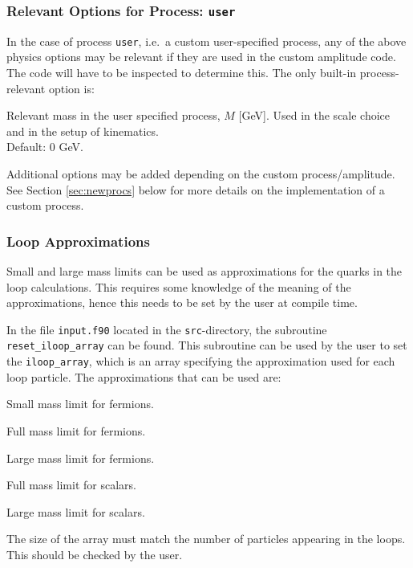 \documentclass[12pt,a4wide]{article}
\begin{document}
\subsubsection{Relevant Options for Process: \texttt{user}}
In the case of process \texttt{user}, i.e.\ a custom user-specified process, any of the above physics options may be relevant if they are used in the custom amplitude code. The code will have to be inspected to determine this. The only built-in process-relevant option is: 
\begin{description}[labelindent=\parindent, labelwidth =\widthof{\bfseries9999999999999999999999}, leftmargin = !] 
	\item[\texttt{--mass <value>}] Relevant mass in the user specified process, $M$ [GeV]. Used in the scale choice and in the setup of kinematics. \\ Default: 0 GeV. 
\end{description}
Additional options may be added depending on the custom process/amplitude. See Section \ref{sec:newprocs} below for more details on the implementation of a custom process. 

\subsubsection{Loop Approximations} \label{sec:loopapprox} 
Small and large mass limits can be used as approximations for the quarks in the loop calculations. This requires some knowledge of the meaning of the approximations, hence this needs to be set by the user at compile time. 

In the file \texttt{input.f90} located in the \texttt{src}-directory, the subroutine \texttt{reset\_iloop\_array} can be found. This subroutine can be used by the user to set the \texttt{iloop\_array}, which is an array specifying the approximation used for each loop particle. The approximations that can be used are: 
\begin{description}[labelindent=3\parindent, labelwidth =\widthof{\bfseries9999999999999999999}, leftmargin = !] 
	\item[\texttt{iloop\_sm\_fermion}] Small mass limit for fermions. 
	\item[\texttt{iloop\_fm\_fermion}] Full mass limit for fermions. 
	\item[\texttt{iloop\_lm\_fermion}] Large mass limit for fermions. 
	\item[\texttt{iloop\_fm\_scalar}] Full mass limit for scalars. 
	\item[\texttt{iloop\_lm\_scalar}] Large mass limit for scalars. 
\end{description}
The size of the array must match the number of particles appearing in the loops. This should be checked by the user.  
\end{document}
